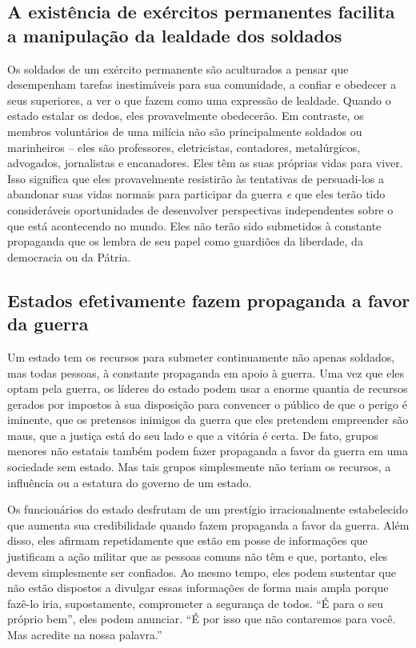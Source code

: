 \subsection*{A existência de exércitos permanentes facilita a manipulação da lealdade dos soldados}

Os soldados de um exército permanente são aculturados a pensar que desempenham tarefas inestimáveis para sua comunidade, a confiar e obedecer a seus superiores, a ver o que fazem como uma expressão de lealdade. Quando o estado estalar os dedos, eles provavelmente obedecerão. Em contraste, os membros voluntários de uma milícia não são principalmente soldados ou marinheiros -- eles são professores, eletricistas, contadores, metalúrgicos, advogados, jornalistas e encanadores. Eles têm as suas próprias vidas para viver. Isso significa que eles provavelmente resistirão às tentativas de persuadi-los a abandonar suas vidas normais para participar da guerra \emph{e} que eles terão tido consideráveis oportunidades de desenvolver perspectivas independentes sobre o que está acontecendo no mundo. Eles não terão sido submetidos à constante propaganda que os lembra de seu papel como guardiões da liberdade, da democracia ou da Pátria.

\subsection*{Estados efetivamente fazem propaganda a favor da guerra}

Um estado tem os recursos para submeter continuamente não apenas soldados, mas todas pessoas, à constante propaganda em apoio à guerra. Uma vez que eles optam pela guerra, os líderes do estado podem usar a enorme quantia de recursos gerados por impostos à sua disposição para convencer o público de que o perigo é iminente, que os pretensos inimigos da guerra que eles pretendem empreender são maus, que a justiça está do seu lado e que a vitória é certa. De fato, grupos menores não estatais também podem fazer propaganda a favor da guerra em uma sociedade sem estado. Mas tais grupos simplesmente não teriam os recursos, a influência ou a estatura do governo de um estado.

Os funcionários do estado desfrutam de um prestígio irracionalmente estabelecido que aumenta sua credibilidade quando fazem propaganda a favor da guerra. Além disso, eles afirmam repetidamente que estão em posse de informações que justificam a ação militar que as pessoas comuns não têm e que, portanto, eles devem simplesmente ser confiados. Ao mesmo tempo, eles podem sustentar que não estão dispostos a divulgar essas informações de forma mais ampla porque fazê-lo iria, supostamente, comprometer a segurança de todos. ``É para o seu próprio bem'', eles podem anunciar. ``É por isso que não contaremos para você. Mas acredite na nossa palavra.''

